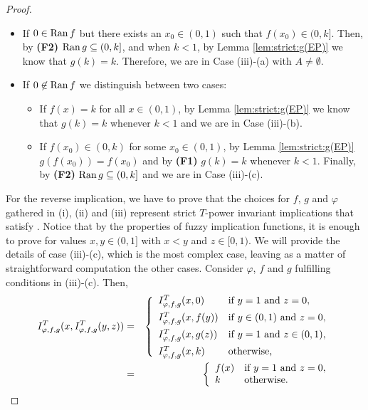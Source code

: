\begin{proof}
\begin{enumerate}
\begin{itemize}
\begin{itemize}
				\item If $0 \in \operatorname{Ran} f$ but there exists an $x_0 \in (0,1)$ such that $f(x_0) \in (0,k]$. Then, by {\bf (F2)} $\operatorname{Ran} g \subseteq (0,k]$, and when $k < 1$, by Lemma \ref{lem:strict:g(EP)} we know that $g(k)=k$. Therefore, we are in Case (iii)-(a) with $A \not = \emptyset$.
				\item If $0 \not \in \operatorname{Ran} f$ we distinguish between two cases:
				\begin{itemize}
					\item If $f(x)=k$ for all $x \in (0,1)$, by Lemma \ref{lem:strict:g(EP)} we know that $g(k)=k$ whenever $k < 1$ and we are in Case (iii)-(b).
					\item If $f(x_0) \in (0,k)$ for some $x_0 \in (0,1)$, by Lemma \ref{lem:strict:g(EP)} $g(f(x_0))=f(x_0)$ and by {\bf (F1)} $g(k)=k$ whenever $k < 1$. Finally, by {\bf (F2)} $\operatorname{Ran} g \subseteq (0,k]$ and we are in Case (iii)-(c).
				\end{itemize}
			\end{itemize}
		\end{itemize}
	\end{enumerate}
	For the reverse implication, we have to prove that the choices for $f$, $g$ and $\varphi$ gathered in (i), (ii) and (iii) represent strict $T$-power invariant implications that satisfy \EP. Notice that by the properties of fuzzy implication functions, it is enough to prove \EP for values $x,y \in (0,1]$ with $x<y$ and $z \in [0,1).$ We will provide the details of case (iii)-(c), which is the most complex case, leaving as a matter of straightforward computation the other cases. Consider $\varphi$, $f$ and $g$ fulfilling conditions in (iii)-(c). Then,
	\begin{eqnarray*}
	I^T_{\varphi,f,g}(x,I^T_{\varphi,f,g}(y,z)) 
	&=&
	\left\{ \begin{array}{ll}
		I^T_{\varphi,f,g}(x,0) &   \text{if }   y=1 \text{ and } z=0, \\[5pt]
		I^T_{\varphi,f,g}(x,f(y)) & \text{if } y\in (0,1) \text{ and } z =0,\\[5pt]
		I^T_{\varphi,f,g}(x,g(z)) & \text{if } y=1 \text{ and } z \in (0,1),\\[5pt]
		I^T_{\varphi,f,g}(x,k) & \text{otherwise,}
	\end{array}
	\right. \\
	&=&
	\left\{ \begin{array}{ll}
		f(x) &   \text{if }   y=1 \text{ and } z=0, \\
		k & \text{otherwise.}
	\end{array}
	\right.
	\end{eqnarray*}

\end{proof}
